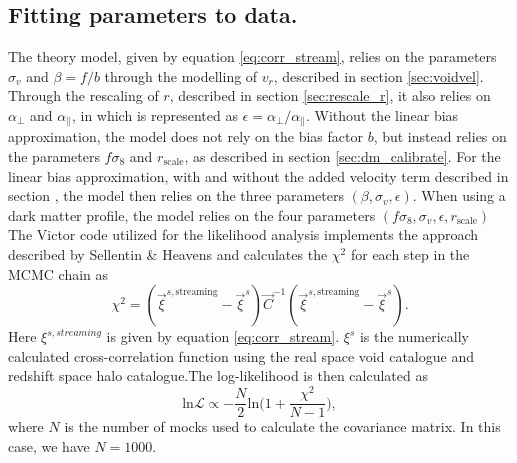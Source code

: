 \subsection{Fitting parameters to data.}
The theory model, given by equation \ref{eq:corr_stream}, relies on the parameters $\sigma_v$ and $\beta=f/b$ through the modelling of $v_r$, described in section \ref{sec:voidvel}. Through the rescaling of $r$, described in section \ref{sec:rescale_r}, it also relies on $\alpha_\perp$ and $\alpha_\parallel$, in which is represented as $\epsilon=\alpha_\perp/\alpha_\parallel$.
Without the linear bias approximation, the model does not rely on the bias factor $b$, but instead relies on the parameters $f\sigma_8$ and $r_\mathrm{scale}$, as described in section \ref{sec:dm_calibrate}. For the linear bias approximation, with and without the added velocity term described in section , the model then relies on the three parameters $(\beta,\sigma_v,\epsilon)$. When using a dark matter profile, the model relies on the four parameters $(f\sigma_8, \sigma_v, \epsilon, r_\mathrm{scale})$
\\\indent
The Victor code utilized for the likelihood analysis implements the approach described by Sellentin \& Heavens \cite{heavens2010statistical} and calculates the $\chi^2$ for each step in the MCMC chain as
\begin{equation}
    \chi^2=(\vec{\xi}^{s,\mathrm{streaming}}-\vec{\xi}^{s})\vec{C}^{-1}(\vec{\xi}^{s,\mathrm{streaming}}-\vec{\xi}^{s}).
\end{equation}
Here $\xi^{s,streaming}$ is given by equation \ref{eq:corr_stream}. $\xi^s$ is the numerically calculated cross-correlation function using the real space void catalogue and redshift space halo catalogue.The log-likelihood is then calculated as
\begin{equation}
    \mathrm{ln}\mathcal{L}\propto-\frac{N}{2}\mathrm{ln}\big(1+\frac{\chi^2}{N-1}\big),
\end{equation}
where $N$ is the number of mocks used to calculate the covariance matrix. In this case, we have $N=1000$.